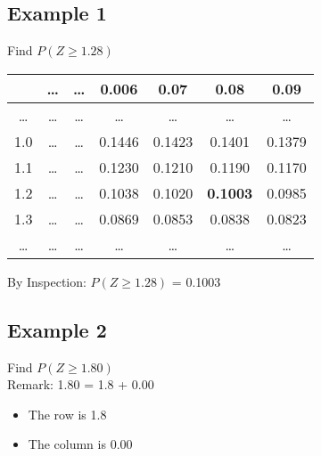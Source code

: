 \documentclass[a4paper,12pt]{article}
\begin{document}
\subsection*{Example 1}
Find $ P(Z \geq 1.28)$
{
\begin{table}[ht]


\centering %
\begin{tabular}{|c|| c c c c |c| c|} %
\hline %
& \ldots & \ldots & 0.006 &0.07&0.08&0.09 \\
\hline \hline%
\ldots & \ldots & \ldots &\ldots& \ldots &\ldots&\dots \\ %
1.0 & \ldots & \ldots &0.1446& 0.1423 &0.1401&0.1379 \\ %
1.1 & \ldots & \ldots&0.1230& 0.1210 &0.1190&0.1170 \\ %
\hline
1.2 & \ldots & \ldots&0.1038 & 0.1020 &\textbf{0.1003}&0.0985\\
\hline
1.3 & \ldots & \ldots &0.0869& 0.0853 &0.0838&0.0823 \\ %
\ldots & \ldots &\ldots&\ldots & \ldots &\ldots&\ldots\\
\hline %
\end{tabular}
\end{table}
}

\noindent By Inspection: $ P(Z \geq 1.28)$ = 0.1003

\subsection*{Example 2}

Find  $P(Z \geq 1.80)$\\

Remark:  1.80 = 1.8 + 0.00
\begin{itemize}
\item The row is 1.8
\item The column is 0.00
\end{itemize}
\end{document}

